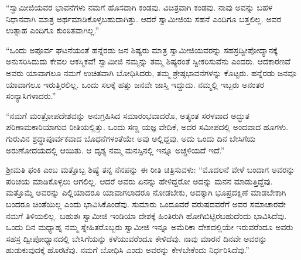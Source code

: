  “ಸ್ವಾಮೀಜಿಯವರ ಭಾವನೆಗಳು ನಮಗೆ ಹೊಸದಾಗಿ ಕಂಡವು. ವಿಚಿತ್ರವಾಗಿ ಕಂಡವು. ನಾವು ಅವನ್ನು ಬಹಳ ನಿಧಾನವಾಗಿ ಮಾತ್ರ ಅರ್ಥಮಾಡಿಕೊಳ್ಳಬಹುದಾಗಿತ್ತು. ಆದರೆ ಸ್ವಾಮೀಜಿಯ ಸಹನೆ ಎಂದಿಗೂ ಬತ್ತಲಿಲ್ಲ. ಅವರ ಉತ್ಸಾಹ ಎಂದಿಗೂ ಕುಂಠಿತವಾಗಿಲ್ಲ.” 

 “ಒಂದು ಅಪೂರ್ವ ಘಟನೆಯಂತೆ ಹನ್ನೆರಡು ಜನ ಶಿಷ್ಯರು ಮಾತ್ರ ಸ್ವಾಮೀಜಿಯವರನ್ನು ಸಹಸ್ರದ್ವೀಪೋದ್ಯಾನಕ್ಕೆ ಅನುಸರಿಸಿದುದು ಕೇವಲ ಆಕಸ್ಮಿಕವೆ! ಸ್ವಾಮೀಜಿ ನಮ್ಮನ್ನು ತಮ್ಮ ಶಿಷ್ಯರಂತೆ ಸ್ವೀಕರಿಸುವೆನು ಎಂದರು. ಆದಕಾರಣವೆ ಅವರು ಯಾವಾಗಲೂ ನಮಗೆ ಉಚಿತವಾಗಿ ಬೋಧಿಸಿದರು, ತಮ್ಮ ಶ್ರೇಷ್ಠಭಾವನೆಗಳನ್ನು ಕೊಟ್ಟರು. ಹನ್ನೆರಡು ಜನವೂ ಯಾವಾಗಲೂ ಇರುತ್ತಿರಲಿಲ್ಲ. ಒಂದು ಸಲಕ್ಕೆ ಹತ್ತು ಜನವೇ ಜಾಸ್ತಿ ಇದ್ದುದು. ನಮ್ಮಲ್ಲಿ ಇಬ್ಬರು ಅನಂತರ ಸಂನ್ಯಾಸಿಗಳಾದರು.” 

 “ನಮಗೆ ಮಂತ್ರೋಪದೇಶವನ್ನು ಅನುಗ್ರಹಿಸಿದ ಸಮಾರಂಭವಾದರೊ, ಅತ್ಯಂತ ಸರಳವಾದ ಅದ್ಭುತ ಪರಿಣಾಮಕಾರಿಯಾಗುವ ರೀತಿಯಲ್ಲಿತ್ತು. ಒಂದು ಸಣ್ಣ ಯಜ್ಞ ವೇದಿಕೆ, ಅದರ ಸಮೀಪದಲ್ಲಿ ಅಂದವಾದ ಹೂಗಳು. ಗುರುವಿನ ಶ್ರದ್ಧಾಪೂರ್ವಕವಾದ ಬೊಧನೆಗಳಂತೆಯೇ ಅವು ಅಲ್ಲಿದ್ದವು. ಅದು ಒಂದು ದಿನ ಬೇಸಿಗೆಯ ಅರುಣೋದಯದಲ್ಲಿ ಆಯಿತು. ಆ ದೃಶ್ಯ ನಮ್ಮ ಮನಸ್ಸಿನಲ್ಲಿ ಇನ್ನೂ ಅಚ್ಚಳಿಯದೆ ಇದೆ.” 

 ಶ‍್ರೀಮತಿ ಫಂಕಿ ಎಂಬ ಮತ್ತೊಬ್ಬ ಶಿಷ್ಯೆ ತನ್ನ ನೆನಪನ್ನು ಈ ರೀತಿ ಚಿತ್ರಿಸುವಳು: “ಮೊದಲನೆ ವೇಳೆ ಬಂದಾಗ ಅವರನ್ನು ಪರಿಚಯ ಮಾಡಿಕೊಳ್ಳಲು ಆಗಲಿಲ್ಲ. ಆದರೆ ಅವರು ಏನನ್ನು ಹೇಳಿದ್ದರೋ ಅದನ್ನು ಮನನ ಮಾಡುತ್ತಿದ್ದೆವು. ಮತ್ತೊಮ್ಮೆ ಅವರನ್ನು ಎಲ್ಲಿಯಾದರೂ ಯಾವಾಗಲಾದರೂ ನೋಡಬೇಕು, ಅದಕ್ಕಾಗಿ ಭೂಪ್ರದಕ್ಷಿಣೆ ಮಾಡಬೇಕಾಗಿ ಬಂದರೂ ಚಿಂತೆಯಿಲ್ಲ ಎಂದು ಭಾವಿಸಿಕೊಂಡೆವು. ಸುಮಾರು ಒಂದೂವರೆ ವರುಷದವರೆಗೆ ಅವರ ಸಮಾಚಾರವೇ ನಮಗೆ ತಿಳಿಯಲಿಲ್ಲ. ಬಹುಶಃ ಸ್ವಾಮೀಜಿ ಇಂಡಿಯಾ ದೇಶಕ್ಕೆ ಹಿಂತಿರುಗಿ ಹೋಗಿಬಿಟ್ಟಿರಬಹುದೆಂದು ಭಾವಿಸಿದೆವು. ಒಂದು ದಿನ ಮಧ್ಯಾಹ್ನ ನಮ್ಮ ಸ್ನೇಹಿತರೊಬ್ಬರು ಸ್ವಾಮೀಜಿ ಇನ್ನೂ ಅಮೆರಿಕಾ ದೇಶದಲ್ಲಿಯೇ ಇರುವರೆಂದೂ ಅವರು ಸಹಸ್ರ ದ್ವೀಪೋಧ್ಯಾನದಲ್ಲಿ ಬೇಸಿಗೆಯನ್ನು ಕಳೆಯುವರೆಂದೂ ಕೇಳಿದೆವು. ನಾವು ಮಾರನೆ ದಿನವೇ ಅವರನ್ನು ಹುಡುಕುವುದಕ್ಕೆ ಹೊರಟೆವು. ನಮಗೆ ಬೋಧಿಸಿ ಎಂದು ಅವರನ್ನು ಕೇಳಬೇಕೆಂದು ನಿರ್ಧರಿಸಿದೆವು.” 


